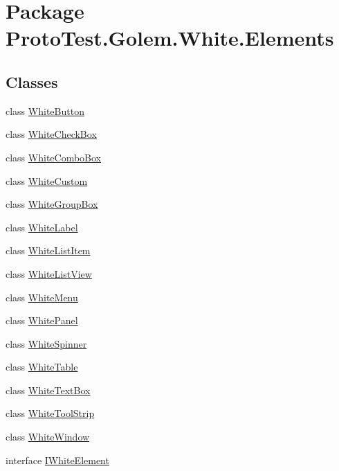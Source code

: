 \hypertarget{namespace_proto_test_1_1_golem_1_1_white_1_1_elements}{\section{Package Proto\-Test.\-Golem.\-White.\-Elements}
\label{namespace_proto_test_1_1_golem_1_1_white_1_1_elements}
}
\subsection*{Classes}
\begin{DoxyCompactItemize}
\item 
class \hyperlink{class_proto_test_1_1_golem_1_1_white_1_1_elements_1_1_white_button}{White\-Button}
\item 
class \hyperlink{class_proto_test_1_1_golem_1_1_white_1_1_elements_1_1_white_check_box}{White\-Check\-Box}
\item 
class \hyperlink{class_proto_test_1_1_golem_1_1_white_1_1_elements_1_1_white_combo_box}{White\-Combo\-Box}
\item 
class \hyperlink{class_proto_test_1_1_golem_1_1_white_1_1_elements_1_1_white_custom}{White\-Custom}
\item 
class \hyperlink{class_proto_test_1_1_golem_1_1_white_1_1_elements_1_1_white_group_box}{White\-Group\-Box}
\item 
class \hyperlink{class_proto_test_1_1_golem_1_1_white_1_1_elements_1_1_white_label}{White\-Label}
\item 
class \hyperlink{class_proto_test_1_1_golem_1_1_white_1_1_elements_1_1_white_list_item}{White\-List\-Item}
\item 
class \hyperlink{class_proto_test_1_1_golem_1_1_white_1_1_elements_1_1_white_list_view}{White\-List\-View}
\item 
class \hyperlink{class_proto_test_1_1_golem_1_1_white_1_1_elements_1_1_white_menu}{White\-Menu}
\item 
class \hyperlink{class_proto_test_1_1_golem_1_1_white_1_1_elements_1_1_white_panel}{White\-Panel}
\item 
class \hyperlink{class_proto_test_1_1_golem_1_1_white_1_1_elements_1_1_white_spinner}{White\-Spinner}
\item 
class \hyperlink{class_proto_test_1_1_golem_1_1_white_1_1_elements_1_1_white_table}{White\-Table}
\item 
class \hyperlink{class_proto_test_1_1_golem_1_1_white_1_1_elements_1_1_white_text_box}{White\-Text\-Box}
\item 
class \hyperlink{class_proto_test_1_1_golem_1_1_white_1_1_elements_1_1_white_tool_strip}{White\-Tool\-Strip}
\item 
class \hyperlink{class_proto_test_1_1_golem_1_1_white_1_1_elements_1_1_white_window}{White\-Window}
\item 
interface \hyperlink{interface_proto_test_1_1_golem_1_1_white_1_1_elements_1_1_i_white_element}{I\-White\-Element}
\end{DoxyCompactItemize}
